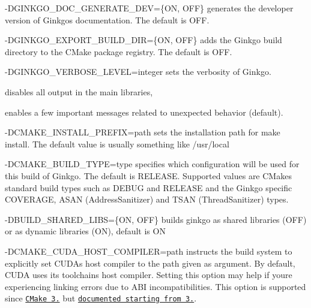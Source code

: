 \begin{DoxyItemize}
\item {\ttfamily -\/\+D\+G\+I\+N\+K\+G\+O\+\_\+\+D\+O\+C\+\_\+\+G\+E\+N\+E\+R\+A\+T\+E\+\_\+\+D\+EV=\{ON, O\+FF\}} generates the developer version of Ginkgo\textquotesingle{}s documentation. The default is {\ttfamily O\+FF}.
\item {\ttfamily -\/\+D\+G\+I\+N\+K\+G\+O\+\_\+\+E\+X\+P\+O\+R\+T\+\_\+\+B\+U\+I\+L\+D\+\_\+\+D\+IR=\{ON, O\+FF\}} adds the Ginkgo build directory to the C\+Make package registry. The default is {\ttfamily O\+FF}.
\item {\ttfamily -\/\+D\+G\+I\+N\+K\+G\+O\+\_\+\+V\+E\+R\+B\+O\+S\+E\+\_\+\+L\+E\+V\+EL=integer} sets the verbosity of Ginkgo.
\begin{DoxyItemize}
\item {} disables all output in the main libraries,
\item {} enables a few important messages related to unexpected behavior (default).
\end{DoxyItemize}
\item {\ttfamily -\/\+D\+C\+M\+A\+K\+E\+\_\+\+I\+N\+S\+T\+A\+L\+L\+\_\+\+P\+R\+E\+F\+IX=path} sets the installation path for {\ttfamily make install}. The default value is usually something like {\ttfamily /usr/local}
\item {\ttfamily -\/\+D\+C\+M\+A\+K\+E\+\_\+\+B\+U\+I\+L\+D\+\_\+\+T\+Y\+PE=type} specifies which configuration will be used for this build of Ginkgo. The default is {\ttfamily R\+E\+L\+E\+A\+SE}. Supported values are C\+Make\textquotesingle{}s standard build types such as {\ttfamily D\+E\+B\+UG} and {\ttfamily R\+E\+L\+E\+A\+SE} and the Ginkgo specific {\ttfamily C\+O\+V\+E\+R\+A\+GE}, {\ttfamily A\+S\+AN} (Address\+Sanitizer) and {\ttfamily T\+S\+AN} (Thread\+Sanitizer) types.
\item {\ttfamily -\/\+D\+B\+U\+I\+L\+D\+\_\+\+S\+H\+A\+R\+E\+D\+\_\+\+L\+I\+BS=\{ON, O\+FF\}} builds ginkgo as shared libraries ({\ttfamily O\+FF}) or as dynamic libraries ({\ttfamily ON}), default is {\ttfamily ON}
\item {\ttfamily -\/\+D\+C\+M\+A\+K\+E\+\_\+\+C\+U\+D\+A\+\_\+\+H\+O\+S\+T\+\_\+\+C\+O\+M\+P\+I\+L\+ER=path} instructs the build system to explicitly set C\+U\+DA\textquotesingle{}s host compiler to the path given as argument. By default, C\+U\+DA uses its toolchain\textquotesingle{}s host compiler. Setting this option may help if you\textquotesingle{}re experiencing linking errors due to A\+BI incompatibilities. This option is supported since \href{https://github.com/Kitware/CMake/commit/489c52ce680df6439f9c1e553cd2925ca8944cb1}{\tt C\+Make 3.} but \href{https://cmake.org/cmake/help/v3.10/variable/CMAKE_CUDA_HOST_COMPILER.html}{\tt documented starting from 3.}.

\end{DoxyItemize}
